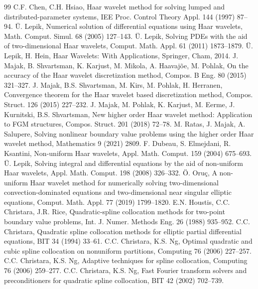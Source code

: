 \documentclass[smallextended,envcountsame]{svjour3}
\begin{document}
\begin{thebibliography}{99}
 C.F. Chen, C.H. Hsiao, Haar wavelet method for solving lumped and distributed-parameter systems, IEE Proc. Control Theory Appl. 144 (1997) 87--94.
 \"U. Lepik, Numerical solution of differential equations using Haar wavelets, Math. Comput. Simul. 68 (2005) 127--143.
 \"U. Lepik, Solving PDEs with the aid of two-dimensional Haar wavelets, Comput. Math. Appl. 61 (2011) 1873--1879.
 \"U. Lepik, H. Hein, Haar Wavelets: With Applications, Springer, Cham, 2014.
 J. Majak, B. Shvartsman, K. Karjust, M. Mikola, A. Haavaj\~oe, M. Pohlak, On the accuracy of the Haar wavelet discretization method, Compos. B Eng. 80 (2015) 321--327.
 J. Majak, B.S. Shvartsman, M. Kirs, M. Pohlak, H. Herranen, Convergence theorem for the Haar wavelet based discretization method, Compos. Struct. 126 (2015) 227--232.
 J. Majak, M. Pohlak, K. Karjust, M. Eerme, J. Kurnitski, B.S. Shvartsman, New higher order Haar wavelet method: Application to FGM structures, Compos. Struct. 201 (2018) 72--78.
 M. Ratas, J. Majak, A. Salupere, Solving nonlinear boundary value problems using the higher order Haar wavelet method, Mathematics 9 (2021) 2809.
 F. Dubeau, S. Elmejdani, R. Ksantini, Non-uniform Haar wavelets, Appl. Math. Comput. 159 (2004) 675--693.
 \"U. Lepik, Solving integral and differential equations by the aid of non-uniform Haar wavelets, Appl. Math. Comput. 198 (2008) 326--332.
 \"O. Oru\c{c}, A non-uniform Haar wavelet method for numerically solving two-dimensional convection-dominated equations and two-dimensional near singular elliptic equations, Comput. Math. Appl. 77 (2019) 1799--1820.
 E.N. Houstis, C.C. Christara, J.R. Rice, Quadratic-spline collocation methods for two-point boundary value problems, Int. J. Numer. Methods Eng. 26 (1988) 935--952.
 C.C. Christara, Quadratic spline collocation methods for elliptic partial differential equations, BIT 34 (1994) 33--61.
 C.C. Christara, K.S. Ng, Optimal quadratic and cubic spline collocation on nonuniform partitions, Computing 76 (2006) 227--257.
 C.C. Christara, K.S. Ng, Adaptive techniques for spline collocation, Computing 76 (2006) 259--277.
 C.C. Christara, K.S. Ng, Fast Fourier transform solvers and preconditioners for quadratic spline collocation, BIT 42 (2002) 702--739.

\end{thebibliography}
\end{document}
